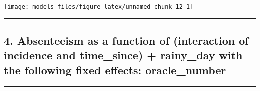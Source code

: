 \documentclass[]{article}
\begin{document}
\begin{center}\texttt{[image: models\_files/figure-latex/unnamed-chunk-12-1]} \end{center}

\newpage

\begin{center}\rule{0.5\linewidth}{\linethickness}\end{center}

\subsection{4. Absenteeism as a function of (interaction of incidence
and time\_since) + rainy\_day with the following fixed effects:
oracle\_number}\label{absenteeism-as-a-function-of-interaction-of-incidence-and-time_since-rainy_day-with-the-following-fixed-effects-oracle_number}

\begin{center}\rule{0.5\linewidth}{\linethickness}\end{center}
\end{document}
